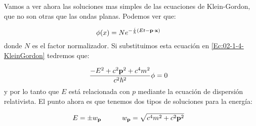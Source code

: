 Vamos a ver ahora las soluciones mas simples de las ecuaciones de Klein-Gordon, que no son otras que las ondas planas. Podemos ver que:

\begin{equation}
    \phi (x) = N e^{-\frac{i}{\hbar} (Et - \mathbf{p} \cdot \mathbf{x})}
\end{equation}
donde $N$ es el factor normalizador. Si substituimos esta ecuación en \ref{Ec:02-1-4-KleinGordon} tedremos que:

\begin{equation}
    \frac{-E^2 + c^2 \mathbf{p}^2 + c^4 m^2}{c^2 \hbar^2}\phi = 0
\end{equation}
y por lo tanto que $E$ está relacionada con $p$ mediante la ecuación de dispersión relativista. El punto ahora es que tenemos dos tipos de soluciones para la energía:

\begin{equation}
    E = \pm w_{\mathbf{p}} \quad \quad \quad w_{\mathbf{p}} = \sqrt{c^4 m^2 + c^2\mathbf{p}^2}
\end{equation}
